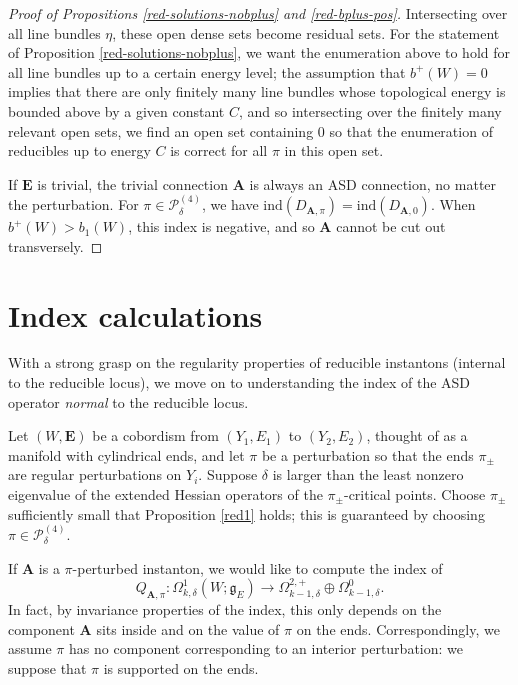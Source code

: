 \documentclass[10pt,a4paper]{amsart}
\theoremstyle{definition}
\theoremstyle{remark}
\numberwithin{figure}{qchap}
\begin{document}
\begin{proof}[Proof of Propositions \ref{red-solutions-nobplus} and \ref{red-bplus-pos}]
Intersecting over all line bundles $\eta$, these open dense sets become residual sets. For the statement of Proposition \ref{red-solutions-nobplus}, we want the enumeration above to hold for all line bundles up to a certain energy level; the assumption that $b^+(W) = 0$ implies that there are only finitely many line bundles whose topological energy is bounded above by a given constant $C$, and so intersecting over the finitely many relevant open sets, we find an open set containing $0$ so that the enumeration of reducibles up to energy $C$ is correct for all $\pi$ in this open set.

If $\mathbf{E}$ is trivial, the trivial connection $\mathbf{A}$ is always an ASD connection, no matter the perturbation. For $\pi \in \mathcal P^{(4)}_{\delta}$, we have $\text{ind}(D_{\mathbf{A},\pi}) = \text{ind}(D_{\mathbf{A},0})$. When $b^+(W) > b_1(W)$, this index is negative, and so $\mathbf{A}$ cannot be cut out transversely.
\end{proof}

\section{Index calculations}\label{sec:4d-index}
With a strong grasp on the regularity properties of reducible instantons (internal to the reducible locus), we move on to understanding the index of the ASD operator \emph{normal} to the reducible locus. 

Let $(W,\mathbf{E})$ be a cobordism from $(Y_1, E_1)$ to $(Y_2, E_2)$, thought of as a manifold with cylindrical ends, and let $\pi$ be a perturbation so that the ends $\pi_\pm$ are regular perturbations on $Y_i$. Suppose $\delta$ is larger than the least nonzero eigenvalue of the extended Hessian operators of the $\pi_\pm$-critical points. Choose $\pi_\pm$ sufficiently small that Proposition \ref{red1} holds; this is guaranteed by choosing $\pi \in \mathcal P^{(4)}_{\delta}$. 

If $\mathbf{A}$ is a $\pi$-perturbed instanton, we would like to compute the index of $$Q_{\mathbf{A},\pi}: \Omega^1_{k,\delta}(W;\mathfrak g_E) \to \Omega^{2,+}_{k-1,\delta} \oplus \Omega^0_{k-1,\delta}.$$ In fact, by invariance properties of the index, this only depends on the component $\mathbf{A}$ sits inside and on the value of $\pi$ on the ends. Correspondingly, we assume $\pi$ has no component corresponding to an interior perturbation: we suppose that $\pi$ is supported on the ends.
\end{document}
